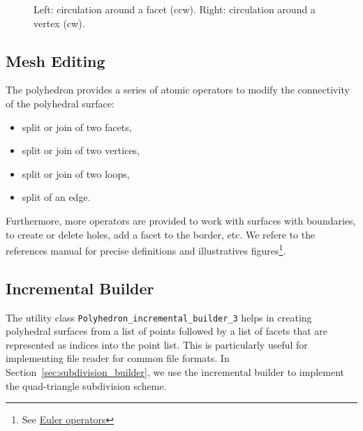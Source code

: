 \documentclass[letter,twoside,10pt]{article}
\begin{document}
\begin{figure}[htb]
    \caption{Left: circulation around a facet (ccw).
             Right: circulation around a vertex (cw).}  
    \label{fig:stl_concept}
\end{figure}

\subsection{Mesh Editing}

The polyhedron provides a series of atomic operators to modify the
connectivity of the polyhedral surface:
\begin{itemize}
\item split or join of two facets,
\item split or join of two vertices,
\item split or join of two loops,
\item split of an edge.
\end{itemize}

Furthermore, more operators are provided to work with surfaces with
boundaries, to create or delete holes, add a facet to the border,
etc. We refere to the references manual for precise definitions and
illustratives figures\footnote{See
\href{http://www.cgal.org/Manual/doc_html/basic_lib/Polyhedron/Chapter_main.html}{Euler 
operators}}.

\subsection{Incremental Builder}
\label{sec:builder}

The utility class \verb+Polyhedron_incremental_builder_3+ helps in
creating polyhedral surfaces from a list of points followed by a list
of facets that are represented as indices into the point list. This is
particularly useful for implementing file reader for common file
formats. In Section~\ref{sec:subdivision_builder}, we use the
incremental builder to implement the quad-triangle subdivision
scheme.\\
\end{document}
